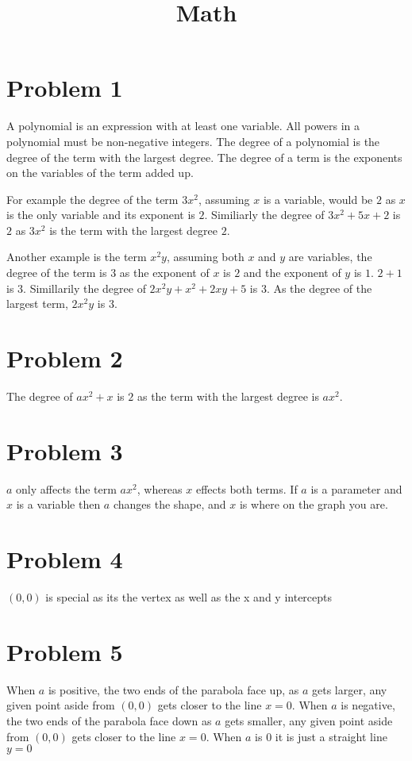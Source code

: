 \documentclass[12pt, letterpaper, twoside]{article}
\title{Math}
\begin{document}
	
	\maketitle
\section{Problem 1}
A polynomial is an expression with at least one variable. All powers in a polynomial must be non-negative integers. The degree of a polynomial is the degree of the term with the largest degree. The degree of a term is the exponents on the variables of the term added up.\par
For example the degree of the term $3x^2$, assuming $x$ is a variable, would be $2$ as $x$ is the only variable and its exponent is $2$. Similiarly the degree of $3x^2 + 5x +2$ is $2$ as $3x^2$ is the term with the largest degree $2$. \par
Another example is the term $x^2y$, assuming both $x$ and $y$ are variables, the degree of the term is $3$ as the exponent of $x$ is $2$ and the exponent of $y$ is $1$. $2 + 1$ is $3$. Simillarily the degree of $2x^2y + x^2 + 2xy + 5$ is $3$. As the degree of the largest term, $2x^2y$ is $3$. 
\section{Problem 2}
The degree of $ax^2 + x$ is $2$ as the term with the largest degree is $ax^2$.
\section{Problem 3}
$a$ only affects the term $ax^2$, whereas $x$ effects both terms. If $a$ is a parameter and $x$ is a variable then $a$ changes the shape, and $x$ is where on the graph you are.
\section{Problem 4}
$(0,0)$ is special as its the vertex as well as the x and y intercepts
\section{Problem 5}
When $a$ is positive, the two ends of the parabola face up, as $a$ gets larger, any given point aside from $(0,0)$ gets closer to the line $x = 0$. When $a$ is negative, the two ends of the parabola face down as $a$ gets smaller, any given point aside from $(0,0)$ gets closer to the line $x = 0$. When $a$ is $0$ it is just a straight line $y=0$
\end{document}
